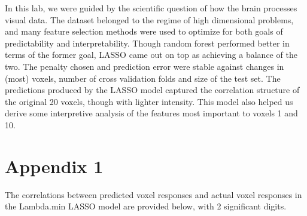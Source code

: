 \documentclass[english]{amsart}
\begin{document}
In this lab, we were guided by the scientific question of how the brain processes visual data.  The dataset belonged to the regime of high dimensional problems, and many feature selection methods were used to optimize for both goals of predictability and interpretability.  Though random forest performed better in terms of the former goal, LASSO came out on top as achieving a balance of the two.  The penalty chosen and prediction error were stable against changes in (most) voxels, number of cross validation folds and size of the test set.  The predictions produced by the LASSO model captured the correlation structure of the original 20 voxels, though with lighter intensity.  This model also helped us derive some interpretive analysis of the features most important to voxels 1 and 10. \\




\section{Appendix 1}

The correlations between predicted voxel responses and actual voxel responses in the Lambda.min LASSO model are provided below, with 2 significant digits. 
\end{document}
